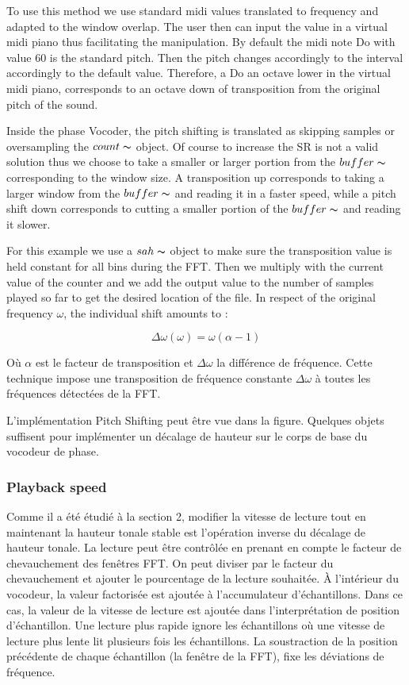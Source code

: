     To use this method we use standard midi values translated to frequency and adapted to the window overlap. The user then can input the value in a virtual midi piano thus facilitating the manipulation. By default the midi note Do with value 60 is the standard pitch. Then the pitch changes accordingly to the interval accordingly to the default value. Therefore, a Do an octave lower in the virtual midi piano, corresponds to an octave down of transposition from the original pitch of the sound.

    Inside the phase Vocoder, the pitch shifting is translated as skipping samples or oversampling the $count\thicksim$ object. Of course to increase the SR is not a valid solution thus we choose to take a smaller or larger portion from the $buffer\thicksim$ corresponding to the window size. A transposition up corresponds to taking a larger window from the $buffer\thicksim$ and reading it in a faster speed, while a pitch shift down corresponds to cutting a smaller portion of the $buffer\thicksim$ and reading it slower.

    For this example we use a $sah\thicksim$ object to make sure the transposition value is held constant for all bins during the FFT. Then we multiply with the current value of the counter and we add the output value to the number of samples played so far to get the desired location of the file. In respect of the original frequency $\omega$, the individual shift amounts to : 

    \begin{equation*}
        \Delta \omega(\omega) = \omega (\alpha - 1)
    \end{equation*}

    Où $ \alpha $ est le facteur de transposition et $ \Delta \omega $ la différence de fréquence. Cette technique impose une transposition de fréquence constante $ \Delta \omega $ à toutes les fréquences détectées de la FFT.

    L'implémentation Pitch Shifting peut être vue dans la figure. Quelques objets suffisent pour implémenter un décalage de hauteur sur le corps de base du vocodeur de phase.


\subsubsection{Playback speed}

    Comme il a été étudié à la section 2, modifier la vitesse de lecture tout en maintenant la hauteur tonale stable est l’opération inverse du décalage de hauteur tonale. La lecture peut être contrôlée en prenant en compte le facteur de chevauchement des fenêtres FFT. On peut diviser par le facteur du chevauchement et ajouter le pourcentage de la lecture souhaitée. À l'intérieur du vocodeur, la valeur factorisée est ajoutée à l'accumulateur d'échantillons. Dans ce cas, la valeur de la vitesse de lecture est ajoutée dans l'interprétation de position d'échantillon. Une lecture plus rapide ignore les échantillons où une vitesse de lecture plus lente lit plusieurs fois les échantillons. La soustraction de la position précédente de chaque échantillon (la fenêtre de la FFT), fixe les déviations de fréquence. 

